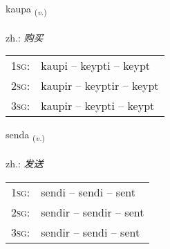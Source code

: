 \documentclass[frontgrid, backgrid]{flacards}\usepackage[]{graphicx}\usepackage[]{xcolor}
\begin{document}
{kaupa \small{\textsubscript{(\textit{v.})}} \\[1ex] %
\textphonetic{[kʰœiːpa]} \\
zh.: \emph{购买} \\  [2ex]
\renewcommand*{\arraystretch}{0.8}
\begin{tabular}{p{1cm}l}
\textsc{1sg}: & kaupi -- keypti -- keypt \\ 
\textsc{2sg}: & kaupir -- keyptir -- keypt \\ 
\textsc{3sg}: & kaupir -- keypti -- keypt \\ 
\end{tabular}
}

\renewcommand{\flhead}{\vskip5pt \fboxsep=0pt {\small\bfseries\footnotesize Sagnorð | 动词}}
\renewcommand{\fcfoot}{\vskip5pt \fboxsep=0pt \hspace{2pt}{\small\bfseries\footnotesize 1K}}

\renewcommand{\blhead}{\vskip5pt {\small\bfseries\footnotesize Sagnorð | 动词 }}
\renewcommand{\bcfoot}{\vskip5pt \hspace{2pt}{\small\bfseries\footnotesize 1K}}


{senda \small{\textsubscript{(\textit{v.})}} \\[1ex] %
\textphonetic{[sɛnta]} \\
zh.: \emph{发送} \\  [2ex]
\renewcommand*{\arraystretch}{0.8}
\begin{tabular}{p{1cm}l}
\textsc{1sg}: & sendi -- sendi -- sent \\ 
\textsc{2sg}: & sendir -- sendir -- sent \\ 
\textsc{3sg}: & sendir -- sendi -- sent \\ 
\end{tabular}
}

\renewcommand{\flhead}{\vskip5pt \fboxsep=0pt {\small\bfseries\footnotesize Sagnorð | 动词}}
\renewcommand{\fcfoot}{\vskip5pt \fboxsep=0pt \hspace{2pt}{\small\bfseries\footnotesize 1K}}
\end{document}
